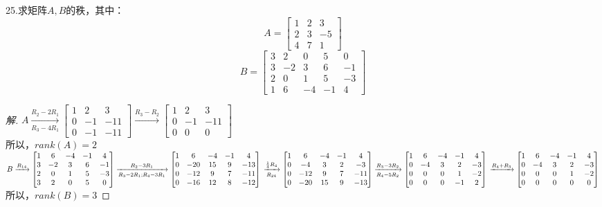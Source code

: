 \documentclass[10pt,a4paper]{report}
\begin{document}
\noindent 25.求矩阵$A, B$的秩，其中：
$$
A = \left[
\begin{matrix}
1 & 2 & 3\\
2 & 3 & -5\\
4 & 7 & 1
\end{matrix}
\right]
$$
$$
B = \left[
\begin{matrix}
3 & 2 & 0 & 5 & 0\\
3 & -2 & 3 & 6 & -1\\
2 & 0 & 1 & 5 & -3\\
1 & 6 & -4 & -1 & 4
\end{matrix}
\right]
$$
\begin{proof}[解]
	$
	A \xrightarrow[R_{3}-4R_{1}]{R_{2}-2R_{1}} \left[
	\begin{matrix}
	1 & 2 & 3\\
	0 & -1 & -11\\
	0 & -1 & -11
	\end{matrix}
	\right] \xrightarrow{R_{3} - R_{2}} \left[
	\begin{matrix}
	1 & 2 & 3\\
	0 & -1 & -11\\
	0 & 0 & 0
	\end{matrix}
	\right]
	$\\
	所以，$rank(A) = 2$\\
	$
	B \xrightarrow{R_{14}} \left[
	\begin{matrix}
	1 & 6 & -4 & -1 & 4\\
	3 & -2 & 3 & 6 & -1\\
	2 & 0 & 1 & 5 & -3\\
	3 & 2 & 0 & 5 & 0
	\end{matrix}
	\right] \xrightarrow[R_{3}-2R_{1};R_{4}-3R_{1}]{R_{2}-3R_{1}} \left[
	\begin{matrix}
	1 & 6 & -4 & -1 & 4\\
	0 & -20 & 15 & 9 & -13\\
	0 & -12 & 9 & 7 & -11\\
	0 & -16 & 12 & 8 & -12
	\end{matrix}
	\right]\\
	\xrightarrow[R_{24}]{\frac{1}{4}R_{4}} \left[
	\begin{matrix}
	1 & 6 & -4 & -1 & 4\\
	0 & -4 & 3 & 2 & -3\\
	0 & -12 & 9 & 7 & -11\\
	0 & -20 & 15 & 9 & -13
	\end{matrix}
	\right] \xrightarrow[R_{4}-5R_{2}]{R_{3}-3R_{2}} \left[
	\begin{matrix}
	1 & 6 & -4 & -1 & 4\\
	0 & -4 & 3 & 2 & -3\\
	0 & 0 & 0 & 1 & -2\\
	0 & 0 & 0 & -1 & 2
	\end{matrix}
	\right] \\
	\xrightarrow{R_{4}+R_{3}} \left[
	\begin{matrix}
	1 & 6 & -4 & -1 & 4\\
	0 & -4 & 3 & 2 & -3\\
	0 & 0 & 0 & 1 & -2\\
	0 & 0 & 0 & 0 & 0
	\end{matrix}
	\right]
	$
	所以，$rank(B) = 3$
\end{proof}
\end{document}
